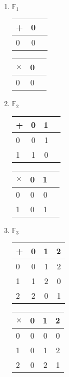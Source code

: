 \begin{solution}
\begin{enumerate}
\item $\mathbb{F}_1$

\begin{center}
  \begin{tabular}{ | l | c | r |}
    \hline
    + & 0 \\ \hline
    0 & 0 \\ \hline 
  \end{tabular}
  \quad
  \begin{tabular}{ | l | c | r |}
    \hline
    $\times$ & 0 \\ \hline
    0 & 0 \\ \hline 
  \end{tabular}
\end{center}

\item $\mathbb{F}_2$

\begin{center}
  \begin{tabular}{ | l | c | r | r |}
    \hline
    + & 0 & 1 \\ \hline
    0 & 0 & 1 \\ \hline 
    1 & 1 & 0 \\ \hline 
  \end{tabular}
  \quad
  \begin{tabular}{ | l | c | r | r |}
    \hline
    $\times$ & 0 & 1 \\ \hline
    0 & 0 & 0  \\ \hline 
    1 & 0 & 1  \\ \hline 
  \end{tabular}
\end{center}

\item $\mathbb{F}_3$

\begin{center}
  \begin{tabular}{ | l | c | r | r |}
    \hline
    + & 0 & 1 & 2 \\ \hline
    0 & 0 & 1 & 2 \\ \hline 
    1 & 1 & 2 & 0 \\ \hline 
    2 & 2 & 0 & 1 \\ \hline
  \end{tabular}
  \quad
  \begin{tabular}{ | l | c | r | r |}
    \hline
    $\times$ & 0 & 1 & 2 \\ \hline
    0 & 0 & 0 & 0 \\ \hline 
    1 & 0 & 1 & 2 \\ \hline 
    2 & 0 & 2 & 1 \\ \hline
  \end{tabular}
\end{center}


\end{enumerate}
\end{solution}
